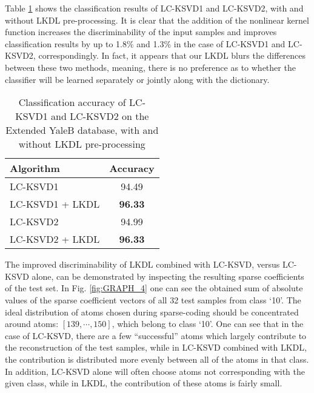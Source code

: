 \documentclass[journal]{IEEEtran}
\begin{document}
Table \ref{table:LCKSVD YaleB_performance} shows the classification results of LC-KSVD1 and LC-KSVD2, with and without LKDL pre-processing. It is clear that the addition of the nonlinear kernel function increases the discriminability of the input samples and improves classification results by up to 1.8\% and 1.3\% in the case of LC-KSVD1 and LC-KSVD2, correspondingly. In fact, it appears that our LKDL blurs the differences between these two methods, meaning, there is no preference as to whether the classifier will be learned separately or jointly along with the dictionary.

\begin{table}[!t]
\caption{Classification accuracy of LC-KSVD1 and LC-KSVD2 on the Extended YaleB database, with and without LKDL pre-processing}
\label{table:LCKSVD YaleB_performance}
\centering
\begin{tabular}{||l||c||}
\multicolumn{1}{l}{\bf Algorithm}  &\multicolumn{1}{c}{\bf Accuracy} \\
\hline
LC-KSVD1 & 94.49 \\
\hline
LC-KSVD1 + LKDL & \textbf{96.33} \\
\hline
\hline
LC-KSVD2 & 94.99 \\
\hline
LC-KSVD2 + LKDL & \textbf{96.33} \\
\hline
\end{tabular}
\end{table}

The improved discriminability of LKDL combined with LC-KSVD, versus LC-KSVD alone, can be demonstrated by inspecting the resulting sparse coefficients of the test set. In Fig. \ref{fig:GRAPH_4} one can see the obtained sum of absolute values of the sparse coefficient vectors of all 32 test samples from class `10'. The ideal distribution of atoms chosen during sparse-coding should be concentrated around atoms: $[139,\cdots,150]$, which belong to class `10'.
One can see that in the case of LC-KSVD, there are a few ``successful'' atoms which largely contribute to the reconstruction of the test samples, while in LC-KSVD combined with LKDL, the contribution is distributed more evenly between all of the atoms in that class. In addition, LC-KSVD alone will often choose atoms not corresponding with the given class, while in LKDL, the contribution of these atoms is fairly small.
\end{document}
